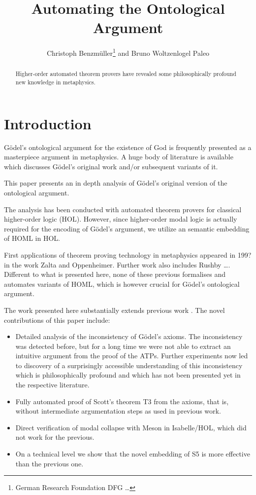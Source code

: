 \documentclass{article}
\title{Automating the Ontological Argument}
\author{Christoph Benzmüller\thanks{German Research Foundation DFG \ldots} and Bruno Woltzenlogel Paleo}
\author{}
\begin{document}
\maketitle

\begin{abstract}
  Higher-order automated theorem provers have revealed some
  philosophically profound new knowledge in metaphysics.
\end{abstract}

\section{Introduction}
G\"{o}del's ontological argument for the existence of God is frequently
presented as a masterpiece argument in metaphysics. A huge body of
literature is available which discusses G\"{o}del's original work and/or
subsequent variants of it.

This paper presents an in depth analysis of G\"{o}del's original version
of the ontological argument.   

The analysis has been conducted with automated theorem provers for
classical higher-order logic (HOL). However, since higher-order modal
logic is actually required for the encoding of G\"{o}del's argument, we
utilize an semantic embedding of HOML in HOL.


First applications of theorem proving technology in metaphysics
appeared in 199? in the work Zalta and Oppenheimer.  Further work also
includes Rushby \ldots. Different to what is presented here, none of
these previous formalises and automates variants of HOML, which is
however crucial for G\"{o}del's ontological argument.


The work presented here substantially extends previous work \cite{}.  
The novel contributions of this paper include:

\begin{itemize}
\item Detailed analysis of the inconsistency of G\"{o}del's axioms. The
inconsistency was detected before, but for a long time we were not
able to extract an intuitive argument from the proof of the ATPs.
Further experiments now led to discovery of a surprisingly accessible
understanding of this inconsistency which is philosophically profound
and which has not been presented yet in the respective literature.

\item Fully automated proof of Scott's theorem T3 from the axioms, that
   is, without intermediate argumentation steps as used in previous
   work.

\item Direct verification of modal collapse with Meson in Isabelle/HOL,
which did not work for the previous.

\item On a technical level we show that the novel embedding of S5 is more
    effective than the previous one.
\end{itemize}
\end{document}
